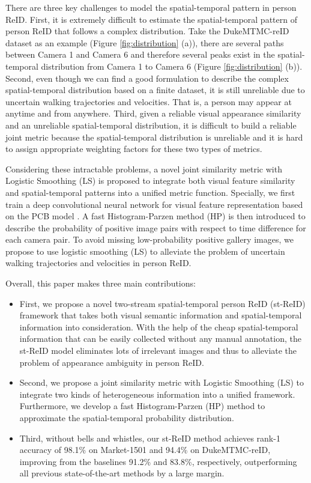 \documentclass[letterpaper]{article} %
\begin{document}
There are three key challenges to model the spatial-temporal pattern in person ReID. First, it is extremely difficult to estimate the spatial-temporal pattern of person ReID that follows a complex distribution. Take the  DukeMTMC-reID dataset as an example (Figure \ref{fig:distribution} (a)), there are several paths between Camera 1 and Camera 6 and therefore several peaks exist in the spatial-temporal distribution from Camera 1 to Camera 6 (Figure \ref{fig:distribution} (b)). Second, even though we can find a good formulation to describe the complex spatial-temporal distribution based on a finite dataset, it is still unreliable due to uncertain walking trajectories and velocities. That is, a person may appear at anytime and from anywhere. Third, given a reliable visual appearance similarity and an unreliable spatial-temporal distribution, it is difficult to build a reliable joint metric because the spatial-temporal distribution is unreliable and it is hard to assign appropriate weighting factors for these two types of metrics.

Considering these intractable problems, a novel joint similarity metric with Logistic Smoothing (LS) is proposed to integrate both visual feature similarity and spatial-temporal patterns into a unified metric function. Specially, we first train a deep convolutional neural network for visual feature representation based on the PCB model \cite{Yifan2017arxiv}. A fast Histogram-Parzen method (HP) is then introduced to describe the probability of positive image pairs with respect to time difference for each camera pair. To avoid missing low-probability positive gallery images, we propose to use logistic smoothing (LS) to alleviate the problem of uncertain walking trajectories and velocities in person ReID.

Overall, this paper makes three main contributions:
\begin{itemize}
  \item First, we propose a novel two-stream spatial-temporal person ReID (st-ReID) framework that takes both visual semantic information and spatial-temporal information into consideration. With the help of the cheap spatial-temporal information that can be easily collected without any manual annotation, the st-ReID model eliminates lots of irrelevant images and thus to alleviate the problem of appearance ambiguity in person ReID.

  \item Second, we propose a joint similarity metric with Logistic Smoothing (LS) to integrate two kinds of heterogeneous information into a unified framework. Furthermore, we develop a fast Histogram-Parzen (HP) method to approximate the spatial-temporal probability distribution.

  \item Third, without bells and whistles, our st-ReID method achieves rank-1 accuracy of 98.1\% on Market-1501 and 94.4\% on DukeMTMC-reID, improving from the baselines 91.2\% and 83.8\%, respectively, outperforming all previous state-of-the-art methods by a large margin.
\end{itemize}
\end{document}
